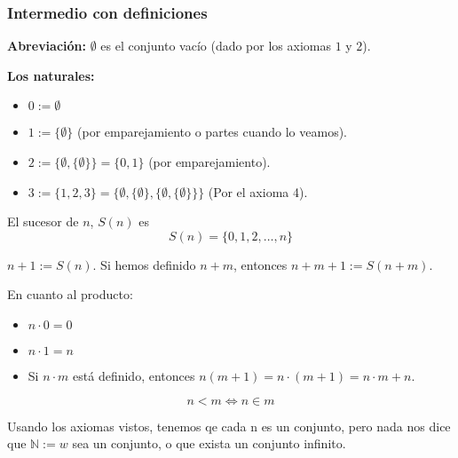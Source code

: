 	\subsubsection{Intermedio con definiciones}
	
	\textbf{Abreviación: } $\emptyset$ es el conjunto vacío (dado por los axiomas $1$ y $2$).
	
	\textbf{Los naturales:} 
	\begin{itemize}
		\item $0:=\emptyset$
		\item $1:=\{\emptyset\}$ (por emparejamiento o partes cuando lo veamos).
		\item $2:=\{\emptyset, \{\emptyset\}\} = \{0,1\}$ (por emparejamiento).
		\item $3:=\{1,2,3\} = \{\emptyset,\{\emptyset\},\{\emptyset, \{\emptyset\}\}\}$ (Por el axioma 4).
	\end{itemize}
	\begin{defn}[Sucesor]
		El sucesor de $n$, $S(n)$ es $$S(n) = \{0,1,2,\hdots, n\}$$
	\end{defn}
	
	\begin{defn}
		$n+1 := S(n)$. Si hemos definido $n+m$, entonces
		$n+m+1 := S(n+m)$.
	\end{defn}
	
	\begin{defn}
		En cuanto al producto:
		\begin{itemize}
			\item $n\cdot0 = 0$
			\item $n\cdot1=n$
			\item Si $n\cdot m$ está definido, entonces $n(m+1) = n\cdot (m+1) = n\cdot m + n$.
		\end{itemize}
	\end{defn}
	
	\begin{defn}[Menor]
		$$n<m\iff n\in m$$
	\end{defn}
	
	Usando los axiomas vistos, tenemos qe cada n es un conjunto, pero nada nos dice que $\mathbb{N} :=w$ sea un conjunto, o que exista un conjunto infinito.
	

